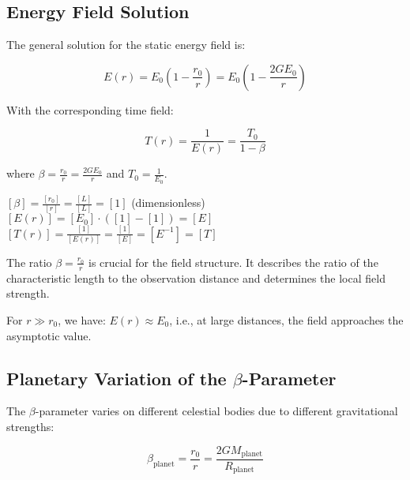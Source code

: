\documentclass[12pt,a4paper]{article}
\theoremstyle{definition}
\begin{document}
	\subsection{Energy Field Solution}
	
	The general solution for the static energy field is:
	
	\begin{equation}
		\boxed{E(r) = E_0\left(1 - \frac{r_0}{r}\right) = E_0\left(1 - \frac{2GE_0}{r}\right)}
	\end{equation}
	
	With the corresponding time field:
	
	\begin{equation}
		T(r) = \frac{1}{E(r)} = \frac{T_0}{1 - \beta}
	\end{equation}
	
	where $\beta = \frac{r_0}{r} = \frac{2GE_0}{r}$ and $T_0 = \frac{1}{E_0}$.
	
	\begin{einheitencheck}
		$[\beta] = \frac{[r_0]}{[r]} = \frac{[L]}{[L]} = [1]$ (dimensionless) \checkmark\\
		$[E(r)] = [E_0] \cdot ([1] - [1]) = [E]$ \checkmark\\
		$[T(r)] = \frac{[1]}{[E(r)]} = \frac{[1]}{[E]} = [E^{-1}] = [T]$ \checkmark
	\end{einheitencheck}
	
	\begin{verhaltnis}
		The ratio $\beta = \frac{r_0}{r}$ is crucial for the field structure. It describes the ratio of the characteristic length to the observation distance and determines the local field strength.
		
		For $r \gg r_0$, we have: $E(r) \approx E_0$, i.e., at large distances, the field approaches the asymptotic value.
	\end{verhaltnis}
	
	\subsection{Planetary Variation of the $\beta$-Parameter}
	
	The $\beta$-parameter varies on different celestial bodies due to different gravitational strengths:
	
	\begin{equation}
		\beta_{\text{planet}} = \frac{r_0}{r} = \frac{2GM_{\text{planet}}}{R_{\text{planet}}}
	\end{equation}
	
\end{document}
